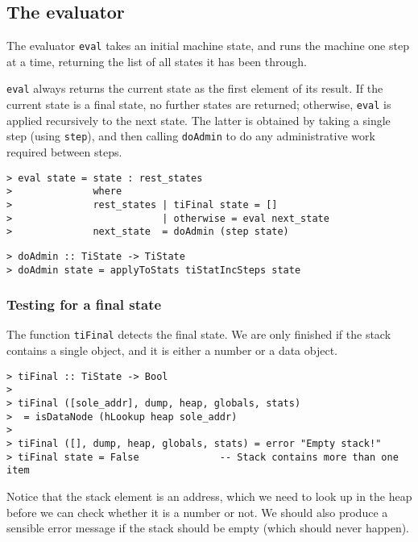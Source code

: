 \subsection{The evaluator}

The evaluator \mbox{\tt eval} takes an initial machine state,
and runs the machine one step at a time, returning the list of
all states it has been through.

\mbox{\tt eval} always returns the current state as the first element of its
result.  If the current state is a final state, no further states are
returned; otherwise, \mbox{\tt eval} is applied recursively to the next state.
The latter is obtained by
taking a single step (using \mbox{\tt step}), and then calling \mbox{\tt doAdmin} to
do any administrative work required between steps.
\begin{verbatim}
> eval state = state : rest_states
>              where
>              rest_states | tiFinal state = []
>                          | otherwise = eval next_state
>              next_state  = doAdmin (step state)
\end{verbatim}
%
\begin{verbatim}
> doAdmin :: TiState -> TiState
> doAdmin state = applyToStats tiStatIncSteps state
\end{verbatim}
%
%
\subsubsection{Testing for a final state}

The function \mbox{\tt tiFinal} detects the final state.
We are only finished if the stack contains a single object, and it is
either a number or a data object.
\begin{verbatim}
> tiFinal :: TiState -> Bool
>
> tiFinal ([sole_addr], dump, heap, globals, stats)
>  = isDataNode (hLookup heap sole_addr)
>
> tiFinal ([], dump, heap, globals, stats) = error "Empty stack!"
> tiFinal state = False              -- Stack contains more than one item
\end{verbatim}
%
%
%
%
Notice that the stack element is an address, which we need to look up in
the heap before we can check whether it is a number or not.
We should also produce a sensible error message if the stack should be empty
(which should never happen).

